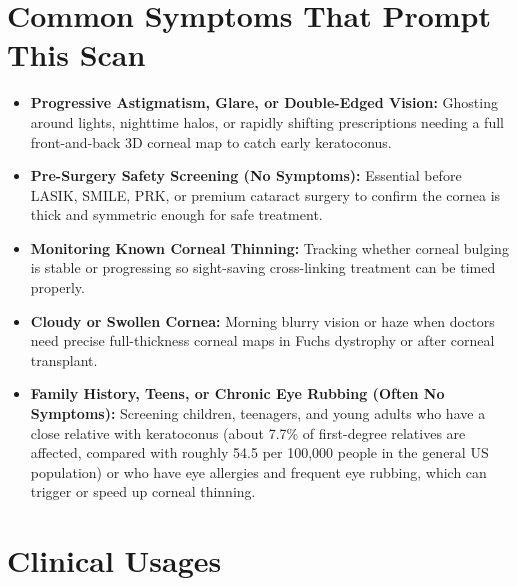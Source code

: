 \section{Common Symptoms That Prompt This Scan}
\begin{itemize}
    \item \textbf{Progressive Astigmatism, Glare, or Double-Edged Vision:} Ghosting around lights, nighttime halos, or rapidly shifting prescriptions needing a full front-and-back 3D corneal map to catch early keratoconus.
    \item \textbf{Pre-Surgery Safety Screening (No Symptoms):} Essential before LASIK, SMILE, PRK, or premium cataract surgery to confirm the cornea is thick and symmetric enough for safe treatment.
    \item \textbf{Monitoring Known Corneal Thinning:} Tracking whether corneal bulging is stable or progressing so sight-saving cross-linking treatment can be timed properly.
    \item \textbf{Cloudy or Swollen Cornea:} Morning blurry vision or haze when doctors need precise full-thickness corneal maps in Fuchs dystrophy or after corneal transplant.
    \item \textbf{Family History, Teens, or Chronic Eye Rubbing (Often No Symptoms):} Screening children, teenagers, and young adults who have a close relative with keratoconus (about 7.7\% of first-degree relatives are affected, compared with roughly 54.5 per 100,000 people in the general US population) or who have eye allergies and frequent eye rubbing, which can trigger or speed up corneal thinning.
\end{itemize}

\section{Clinical Usages}

